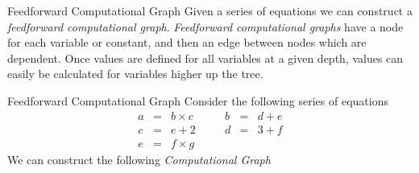 \documentclass[11pt,a4paper]{article}
\begin{document}
\begin{definition}{Feedforward Computational Graph}
  Given a series of equations we can construct a \textit{feedforward computational graph}. \textit{Feedforward computational graphs} have a node for each variable or constant, and then an edge between nodes which are dependent. Once values are defined for all variables at a given depth, values can easily be calculated for variables higher up the tree.
\end{definition}

\begin{example}{Feedforward Computational Graph}
  Consider the following series of equations
  \[\begin{array}{rclcrcl}
    a&=&b\times c&\quad&b&=&d+e\\
    c&=&e+2&&d&=&3+f\\
    e&=&f\times g
  \end{array}\]
  We can construct the following \textit{Computational Graph}
  \begin{center}\end{center}
\end{example}
\end{document}
